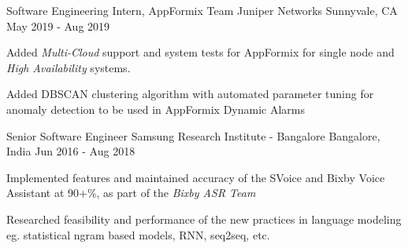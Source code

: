 

\begin{cventries}

    \cventry
      {Software Engineering Intern, AppFormix Team} %
      {Juniper Networks} %
      {Sunnyvale, CA} %
      {May 2019 - Aug 2019} %
      {
        \begin{cvitems}
        \item{Added \textit{Multi-Cloud} support and system tests for AppFormix for single node and \textit{High Availability} systems.}
        \item{Added DBSCAN clustering algorithm with automated parameter tuning for anomaly detection to be used in AppFormix Dynamic Alarms}
        \end{cvitems}
      }

  \cventry
    {Senior Software Engineer} %
    {Samsung Research Institute - Bangalore} %
    {Bangalore, India} %
    {Jun 2016 - Aug 2018} %
    {
      \begin{cvitems}
      \item{Implemented features and maintained accuracy of the SVoice and Bixby Voice Assistant at 90+\%, as part of the \textit{Bixby ASR Team}}
      \item{Researched feasibility and performance of the new practices in language modeling eg. statistical ngram based models, RNN, seq2seq, etc.}
      \end{cvitems}
    }


\end{cventries}
